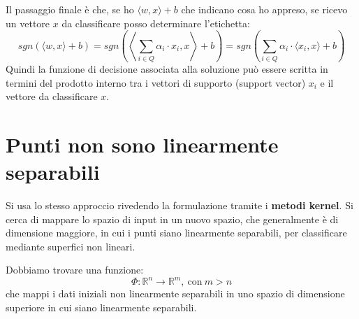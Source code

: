 Il passaggio finale è che, se ho $\langle w, x \rangle + b$ che indicano cosa ho appreso, se ricevo un vettore $x$ da classificare posso determinare l'etichetta:
\begin{equation}
    sgn(\langle w, x \rangle + b) = sgn\left(\left\langle \sum_{i \in Q} \alpha_i \cdot x_i, x \right\rangle + b \right) = sgn\left(\sum_{i \in Q} \alpha_i \cdot \langle x_i, x\rangle + b \right)
\end{equation}
Quindi la funzione di decisione associata alla soluzione può essere scritta in termini del prodotto interno tra i vettori di supporto (support vector) $x_i$ e il vettore da classificare $x$.
\section{Punti non sono linearmente separabili}
Si usa lo stesso approccio rivedendo la formulazione tramite i \textbf{metodi kernel}. Si cerca di mappare lo spazio di input in un nuovo spazio, che generalmente è di dimensione maggiore, in cui i punti siano linearmente separabili, per classificare mediante superfici non lineari.

Dobbiamo trovare una funzione:
\begin{equation}
    \Phi: \mathbb{R}^n \to \mathbb{R}^m, \ \text{con} \ m > n
\end{equation}
che mappi i dati iniziali non linearmente separabili in uno spazio di dimensione superiore in cui siano linearmente separabili.

